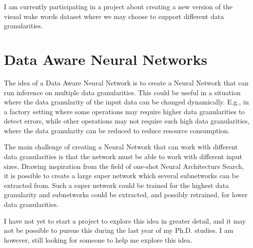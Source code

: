 \documentclass{acaces}
\begin{document}
I am currently participating in a project about creating a new version of the visual wake words dataset\cite{chowdhery2019visual} where we may choose to support different data granularities.

\section{Data Aware Neural Networks}
The idea of a Data Aware Neural Network is to create a Neural Network that can run inference on multiple data granularities.
This could be useful in a situation where the data granularity of the input data can be changed dynamically.
E.g., in a factory setting where some operations may require higher data granularities to detect errors, while other operations may not require such high data granularities, where the data granularity can be reduced to reduce resource consumption.

The main challenge of creating a Neural Network that can work with different data granularities is that the network must be able to work with different input sizes.
Drawing inspiration from the field of one-shot Neural Architecture Search, it is possible to create a large super network which several subnetworks can be extracted from\cite{pham2018efficient}.
Such a super network could be trained for the highest data granularity and subnetworks could be extracted, and possibly retrained, for lower data granularities.

I have not yet to start a project to explore this idea in greater detail, and it may not be possible to pursue this during the last year of my Ph.D. studies.
I am however, still looking for someone to help me explore this idea.



\end{document}
